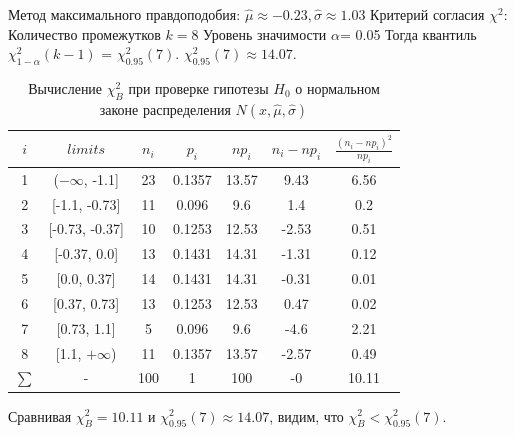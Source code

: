 \documentclass[main.tex]{subfiles}
\begin{document}
\noindent Метод максимального правдоподобия:
\newline
$\hat{\mu} \approx -0.23, \hat{\sigma} \approx 1.03$
\newline
Критерий согласия $\chi^{2}$:
\newline
Количество промежутков $k = 8$
\newline
Уровень значимости $\alpha$= 0.05
\newline
Тогда квантиль $\chi^{2}_{1-\alpha}(k-1)$ = $\chi^{2}_{0.95}(7)$. $\chi^{2}_{0.95}(7) \approx 14.07$. 
\begin{table}[ht]
	\centering
	\begin{tabular}{| c | c | c | c | c | c | c |}
		\hline
		$i$ & $limits$         &   $n_i$ &    $p_i$ &   $np_i$ &   $n_i - np_i$ &   $\frac{(n_i-np_i)^2}{np_i}$ \\
		\hline
		1 & ($-\infty$, -1.1] &    23 & 0.1357 &  13.57 &         9.43 &                        6.56 \\
		2 & [-1.1, -0.73]  &    11 & 0.096  &   9.6  &         1.4  &                        0.2  \\
		3 & [-0.73, -0.37] &    10 & 0.1253 &  12.53 &        -2.53 &                        0.51 \\
		4 & [-0.37, 0.0]   &    13 & 0.1431 &  14.31 &        -1.31 &                        0.12 \\
		5 & [0.0, 0.37]    &    14 & 0.1431 &  14.31 &        -0.31 &                        0.01 \\
		6 & [0.37, 0.73]   &    13 & 0.1253 &  12.53 &         0.47 &                        0.02 \\
		7 & [0.73, 1.1]    &     5 & 0.096  &   9.6  &        -4.6  &                        2.21 \\
		8 & [1.1, $+\infty$)   &    11 & 0.1357 &  13.57 &        -2.57 &                        0.49 \\
		$\sum$ & -              &   100 & 1      & 100    &        -0    &                       10.11 \\
		\hline
	\end{tabular}
	\caption{ Вычисление $\chi^{2}_{B}$ при проверке гипотезы $H_{0}$ о нормальном законе распределения $N(x,\hat{\mu}, \hat{\sigma})$}
	\label{tab:normal_chi_2}
\end{table} 

\noindent Сравнивая $\chi^{2}_{B} = 10.11$ и $\chi^{2}_{0.95}(7) \approx 14.07$,
видим, что $\chi^{2}_{B} < \chi^{2}_{0.95}(7)$.
\end{document}
